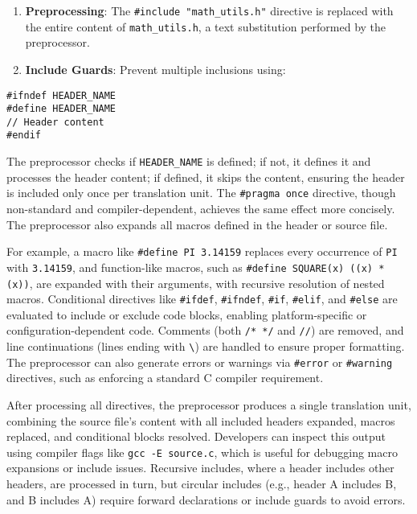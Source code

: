 \documentclass[a4paper,12pt]{article}
\begin{document}
\begin{enumerate}[noitemsep]
    \item \textbf{Preprocessing}: The \texttt{\#include "math\_utils.h"} directive is replaced with the entire content of \texttt{math\_utils.h}, a text substitution performed by the preprocessor.
    \item \textbf{Include Guards}: Prevent multiple inclusions using:
    \end{enumerate}

\begin{lstlisting}[caption=Header guards for the header file]
#ifndef HEADER_NAME
#define HEADER_NAME
// Header content
#endif
\end{lstlisting}

The preprocessor checks if \texttt{HEADER\_NAME} is defined; if not, it defines it and processes the header content; if defined, it skips the content, ensuring the header is included only once per translation unit. The \texttt{\#pragma once} directive, though non-standard and compiler-dependent, achieves the same effect more concisely. The preprocessor also expands all macros defined in the header or source file. 

For example, a macro like \texttt{\#define PI 3.14159} replaces every occurrence of \texttt{PI} with \texttt{3.14159}, and function-like macros, such as \texttt{\#define SQUARE(x) ((x) * (x))}, are expanded with their arguments, with recursive resolution of nested macros. Conditional directives like \texttt{\#ifdef}, \texttt{\#ifndef}, \texttt{\#if}, \texttt{\#elif}, and \texttt{\#else} are evaluated to include or exclude code blocks, enabling platform-specific or configuration-dependent code. Comments (both \texttt{/* */} and \texttt{//}) are removed, and line continuations (lines ending with \texttt{\textbackslash}) are handled to ensure proper formatting. The preprocessor can also generate errors or warnings via \texttt{\#error} or \texttt{\#warning} directives, such as enforcing a standard C compiler requirement. 

After processing all directives, the preprocessor produces a single translation unit, combining the source file’s content with all included headers expanded, macros replaced, and conditional blocks resolved. Developers can inspect this output using compiler flags like \texttt{gcc -E source.c}, which is useful for debugging macro expansions or include issues. Recursive includes, where a header includes other headers, are processed in turn, but circular includes (e.g., header A includes B, and B includes A) require forward declarations or include guards to avoid errors.
\end{document}
